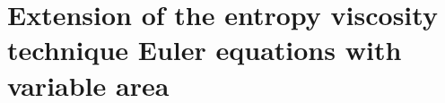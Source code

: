 \documentclass[preprint,10pt]{elsarticle}
\newcommand{\eqt}[1]{Eq.~(\ref{#1})}                     %
\newcommand{\sct}[1]{Section~\ref{#1}}                   %
\newcommand{\tcr}[1]{\textcolor{red}{#1}}
\newtheorem{remark}{Remark}
\begin{document}

\section{Extension of the entropy viscosity technique Euler equations with variable area} \label{sec:var_area_diss_terms}
\end{document}
